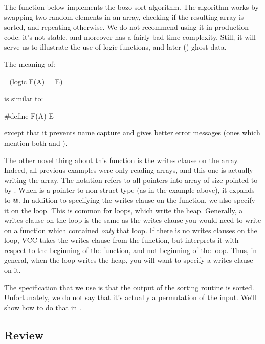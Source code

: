 {{%
The function below implements the bozo-sort algorithm.
The algorithm works by swapping two random elements in an array, checking if the resulting array
is sorted, and repeating otherwise.
We do not recommend using it in production code:
it's not stable, and moreover has a fairly bad time complexity.
Still, it will serve us to illustrate the use of logic functions, and later () ghost data.


\noindent
The meaning of:
\begin{VCC}
_(logic F(A) = E)
\end{VCC}
is similar to:
\begin{VCC}
#define F(A) E
\end{VCC}
except that it prevents
name capture and gives better error messages (\ie ones which mention both  and ).

The other novel thing about this function is the writes clause on the array.
Indeed, all previous examples were only reading arrays, and this one is actually writing
the array.
The notation  refers to all pointers into array
of size  pointed to by .
When  is a pointer to non-struct type (as in the example above),
it expands to @.
In addition to specifying the writes clause on the function, we also specify it on
the loop.
This is common for loops, which write the heap.
Generally, a writes clause on the loop is the same as the writes clause you would need to
write on a function which contained \emph{only} that loop.
If there is no writes clauses on the loop, VCC takes the writes clause from the 
function, but interprets it with respect to the beginning of the function,
and not beginning of the loop.
Thus, in general, when the loop writes the heap, you will want to specify a writes clause on it.

The specification that we use is that the output of the sorting routine is sorted.
Unfortunately, we do not say that it's actually a permutation of the input.
We'll show how to do that in .

\subsection{Review}
%

}}
